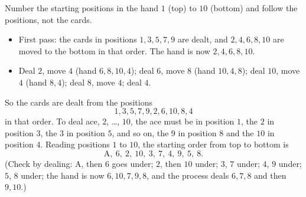Number the starting positions in the hand $1$ (top) to $10$ (bottom) and follow the positions, not the cards.
\begin{itemize}
\item First pass: the cards in positions $1,3,5,7,9$ are dealt, and $2,4,6,8,10$ are moved to the bottom in that order. The hand is now $2,4,6,8,10$.
\item Deal $2$, move $4$ (hand $6,8,10,4$); deal $6$, move $8$ (hand $10,4,8$); deal $10$, move $4$ (hand $8,4$); deal $8$, move $4$; deal $4$.
\end{itemize}
So the cards are dealt from the positions
\[1,3,5,7,9,2,6,10,8,4\]
in that order. To deal ace, $2$, \dots, $10$, the ace must be in position $1$, the $2$ in position $3$, the $3$ in position $5$, and so on, the $9$ in position $8$ and the $10$ in position $4$. Reading positions $1$ to $10$, the starting order from top to bottom is
\[\boxed{\text{A},\ 6,\ 2,\ 10,\ 3,\ 7,\ 4,\ 9,\ 5,\ 8}.\]
(Check by dealing: A, then $6$ goes under; $2$, then $10$ under; $3$, $7$ under; $4$, $9$ under; $5$, $8$ under; the hand is now $6,10,7,9,8$, and the process deals $6,7,8$ and then $9,10$.)
